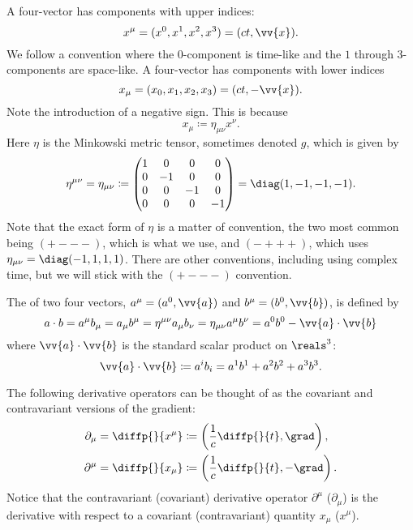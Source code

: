 \documentclass[fleqn]{NotesClass}
\begin{document}
    A  four-vector has components with upper indices:
    \begin{equation}
        x^\mu = (x^0, x^1, x^2, x^3) = (ct, \vv{x}).
    \end{equation}
    We follow a convention where the \(0\)-component is time-like and the \(1\) through \(3\)-components are space-like.
    A  four-vector has components with lower indices
    \begin{equation}
        x_\mu = (x_0, x_1, x_2, x_3) = (ct, -\vv{x}).
    \end{equation}
    Note the introduction of a negative sign.
    This is because
    \begin{equation}
        x_\mu \coloneqq \eta_{\mu\nu}x^{\nu}.
    \end{equation}
    Here \(\eta\) is the Minkowski metric tensor, sometimes denoted \(g\), which is given by
    \begin{equation}
        \eta^{\mu\nu} = \eta_{\mu\nu} \coloneqq
        \begin{pmatrix}
            1 & 0 & 0 & 0\\
            0 & -1 & 0 & 0\\
            0 & 0 & -1 & 0\\
            0 & 0 & 0 & -1
        \end{pmatrix}
        = \diag(1, -1, -1, -1).
    \end{equation}
    Note that the exact form of \(\eta\) is a matter of convention, the two most common being \(({+}{-}{-}{-})\), which is what we use, and \(({-}{+}{+}{+})\), which uses \(\eta_{\mu\nu} = \diag(-1,1,1,1)\).
    There are other conventions, including using complex time, but we will stick with the \(({+}{-}{-}{-})\) convention.
    
    The  of two four vectors, \(a^\mu = (a^0, \vv{a})\) and \(b^\mu = (b^0, \vv{b})\), is defined by
    \begin{equation}
        a \cdot b = a^\mu b_\mu = a_\mu b^\mu = \eta^{\mu\nu}a_\mu b_\nu = \eta_{\mu\nu}a^\mu b^\nu = a^0b^0 - \vv{a} \cdot \vv{b}
    \end{equation}
    where \(\vv{a} \cdot \vv{b}\) is the standard scalar product on \(\reals^3\):
    \begin{equation}
        \vv{a} \cdot \vv{b} \coloneqq a^ib_i = a^1b^1 + a^2b^2 + a^3b^3.
    \end{equation}
    
    The following derivative operators can be thought of as the covariant and contravariant versions of the gradient:
    \begin{align}
        \partial_\mu &= \diffp{}{x^\mu} \coloneqq \left( \frac{1}{c}\diffp{}{t}, \grad \right),\\
        \partial^\mu &= \diffp{}{x_\mu} \coloneqq \left( \frac{1}{c}\diffp{}{t}, -\grad \right).
    \end{align}
    Notice that the contravariant (covariant) derivative operator \(\partial^\mu\) (\(\partial_\mu\)) is the derivative with respect to a covariant (contravariant) quantity \(x_\mu\) (\(x^\mu\)).
    
\end{document}
